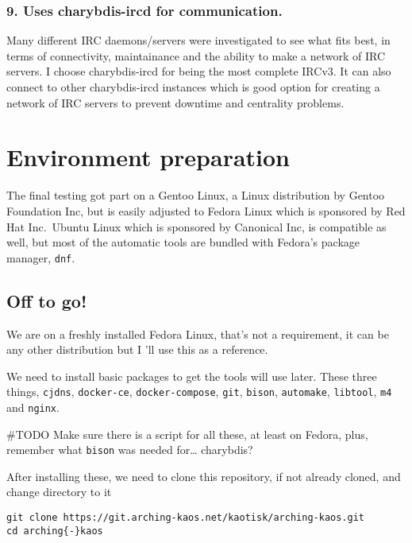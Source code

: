 \documentclass[12pt]{report}
\begin{document}
\subsubsection{9. Uses charybdis-ircd for
communication.}\label{uses-charybdis-ircd-for-communication.}

Many different IRC daemons/servers were investigated to see what fits
best, in terms of connectivity, maintainance and the ability to make a
network of IRC servers. I choose charybdis-ircd for being the most
complete IRCv3. It can also connect to other charybdis-ircd instances
which is good option for creating a network of IRC servers to prevent
downtime and centrality problems.


\section{Environment preparation}\label{environment-preparation}

The final testing got part on a Gentoo Linux, a Linux distribution by
Gentoo Foundation Inc, but is easily adjusted to Fedora Linux which is
sponsored by Red Hat Inc.~Ubuntu Linux which is sponsored by Canonical
Inc, is compatible as well, but most of the automatic tools are bundled
with Fedora's package manager, \texttt{dnf}.


\subsection{Off to go!}\label{off-to-go}

We are on a freshly installed Fedora Linux, that's not a requirement, it
can be any other distribution but I 'll use this as a reference.

We need to install basic packages to get the tools will use later. These
three things, \texttt{cjdns}, \texttt{docker-ce},
\texttt{docker-compose}, \texttt{git}, \texttt{bison},
\texttt{automake}, \texttt{libtool}, \texttt{m4} and \texttt{nginx}.

\#TODO Make sure there is a script for all these, at least on Fedora,
plus, remember what \texttt{bison} was needed for\ldots{} charybdis?

After installing these, we need to clone this repository, if not already
cloned, and change directory to it

\begin{verbatim}
git clone https://git.arching-kaos.net/kaotisk/arching-kaos.git
cd arching{-}kaos
\end{verbatim}
\end{document}
